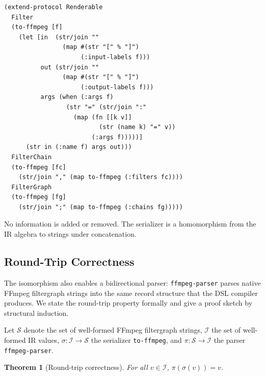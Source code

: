 \documentclass[conference]{IEEEtran}
\newtheorem{theorem}{Theorem}[section]
\begin{document}
\begin{lstlisting}[caption={to-ffmpeg as serializer}]
(extend-protocol Renderable
  Filter
  (to-ffmpeg [f]
    (let [in  (str/join ""
                (map #(str "[" % "]")
                     (:input-labels f)))
          out (str/join ""
                (map #(str "[" % "]")
                     (:output-labels f)))
          args (when (:args f)
                 (str "=" (str/join ":"
                   (map (fn [[k v]]
                          (str (name k) "=" v))
                        (:args f)))))]
      (str in (:name f) args out)))
  FilterChain
  (to-ffmpeg [fc]
    (str/join "," (map to-ffmpeg (:filters fc))))
  FilterGraph
  (to-ffmpeg [fg]
    (str/join ";" (map to-ffmpeg (:chains fg)))))
\end{lstlisting}

No information is added or removed. The serializer is a homomorphism from the IR algebra to strings under concatenation.

\subsection{Round-Trip Correctness}

The isomorphism also enables a bidirectional parser: \texttt{ffmpeg-parser} parses native FFmpeg filtergraph strings into the same record structure that the DSL compiler produces. We state the round-trip property formally and give a proof sketch by structural induction.

Let $\mathcal{S}$ denote the set of well-formed FFmpeg filtergraph strings, $\mathcal{I}$ the set of well-formed IR values, $\sigma : \mathcal{I} \rightarrow \mathcal{S}$ the serializer \texttt{to-ffmpeg}, and $\pi : \mathcal{S} \rightarrow \mathcal{I}$ the parser \texttt{ffmpeg-parser}.

\begin{theorem}[Round-trip correctness]
For all $v \in \mathcal{I}$, $\pi(\sigma(v)) = v$.
\end{theorem}
\end{document}
